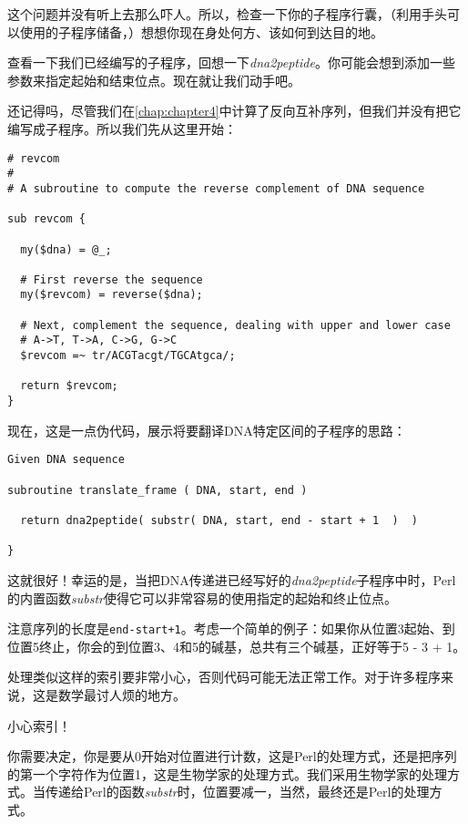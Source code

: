 这个问题并没有听上去那么吓人。所以，检查一下你的子程序行囊，（利用手头可以使用的子程序储备，）想想你现在身处何方、该如何到达目的地。

查看一下我们已经编写的子程序，回想一下\textit{dna2peptide}。你可能会想到添加一些参数来指定起始和结束位点。现在就让我们动手吧。

还记得吗，尽管我们在\autoref{chap:chapter4}中计算了反向互补序列，但我们并没有把它编写成子程序。所以我们先从这里开始：

\begin{lstlisting}
# revcom 
#
# A subroutine to compute the reverse complement of DNA sequence

sub revcom {

  my($dna) = @_;

  # First reverse the sequence
  my($revcom) = reverse($dna);

  # Next, complement the sequence, dealing with upper and lower case
  # A->T, T->A, C->G, G->C
  $revcom =~ tr/ACGTacgt/TGCAtgca/;

  return $revcom;
}
\end{lstlisting}

现在，这是一点伪代码，展示将要翻译DNA特定区间的子程序的思路：

\begin{lstlisting}
Given DNA sequence

subroutine translate_frame ( DNA, start, end )

  return dna2peptide( substr( DNA, start, end - start + 1  )  )

}
\end{lstlisting}

这就很好！幸运的是，当把DNA传递进已经写好的\textit{dna2peptide}子程序中时，Perl的内置函数\textit{substr}使得它可以非常容易的使用指定的起始和终止位点。

注意序列的长度是\verb|end-start+1|。考虑一个简单的例子：如果你从位置3起始、到位置5终止，你会的到位置3、4和5的碱基，总共有三个碱基，正好等于5 - 3 + 1。

处理类似这样的索引要非常小心，否则代码可能无法正常工作。对于许多程序来说，这是数学最讨人烦的地方。


\begin{adjustwidth}{2cm}{2cm}
\noindent
小心索引！
\end{adjustwidth}

你需要决定，你是要从0开始对位置进行计数，这是Perl的处理方式，还是把序列的第一个字符作为位置1，这是生物学家的处理方式。我们采用生物学家的处理方式。当传递给Perl的函数\textit{substr}时，位置要减一，当然，最终还是Perl的处理方式。

